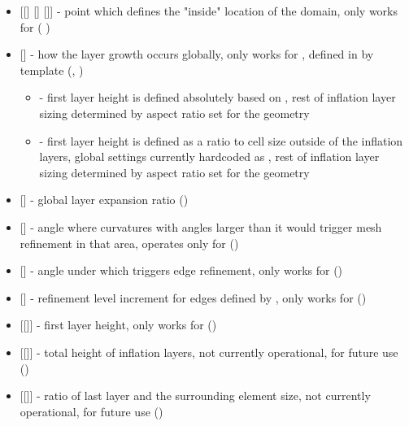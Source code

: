 \begin{itemize}
    \item {} [[] [] []] - point which defines the "inside" location of the domain, only works for  ( )
    
    \item {} [] - how the layer growth occurs globally, only works for , defined in  by template (, )
    \begin{itemize}
    \item {} - first layer height is defined absolutely based on , rest of inflation layer sizing determined by aspect ratio set for the geometry
    
    \item {} - first layer height is defined as a ratio to cell size outside of the inflation layers, global settings currently hardcoded as , rest of inflation layer sizing determined by aspect ratio set for the geometry
    \end{itemize}

    \item {} [] - global layer expansion ratio ()

    \item {} [] - angle where curvatures with angles larger than it would trigger mesh refinement in that area, operates only for  ()

    \item {} [] - angle under which triggers edge refinement, only works for  ()
    
    \item {} [] - refinement level increment for edges defined by , only works for  ()
    
    \item {} [[]] - first layer height, only works for  ()
    
    \item {} [[]] - total height of inflation layers, not currently operational, for future use ()
    
    \item {} [[]] - ratio of last layer and the surrounding element size, not currently operational, for future use ()



\end{itemize}


